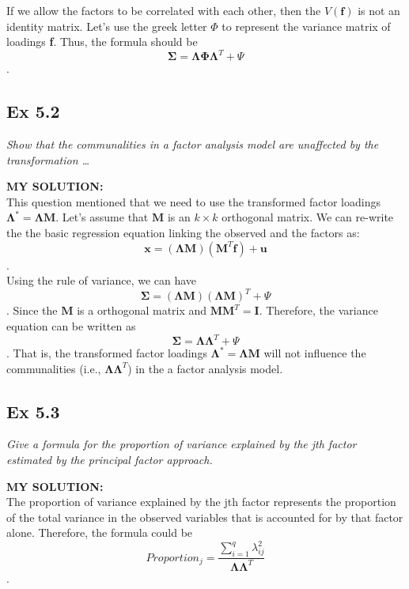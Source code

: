 \documentclass[
]{article}
\begin{document}
If we allow the factors to be correlated with each other, then the
\(V(\boldsymbol f)\) is not an identity matrix. Let's use the greek
letter \(\Phi\) to represent the variance matrix of loadings \textbf{f}.
Thus, the formula should be
\[\boldsymbol \Sigma = \boldsymbol\Lambda \boldsymbol \Phi \boldsymbol\Lambda^T + \Psi\].

\hypertarget{ex-5.2}{%
\subsection{Ex 5.2}\label{ex-5.2}}

\emph{Show that the communalities in a factor analysis model are
unaffected by the transformation \ldots{}}

\textbf{MY SOLUTION:}\\
This question mentioned that we need to use the transformed factor
loadings \(\boldsymbol \Lambda ^* = \boldsymbol \Lambda \boldsymbol M\).
Let's assume that \(\boldsymbol M\) is an \(k \times k\) orthogonal
matrix. We can re-write the the basic regression equation linking the
observed and the factors as:
\[\boldsymbol x=(\boldsymbol\Lambda \boldsymbol M)( \boldsymbol M^T \boldsymbol f) + \boldsymbol u\].\\
Using the rule of variance, we can have
\[\boldsymbol \Sigma = (\boldsymbol\Lambda \boldsymbol M)(\boldsymbol\Lambda \boldsymbol M)^T + \Psi\].
Since the \(\boldsymbol M\) is a orthogonal matrix and
\(\boldsymbol M \boldsymbol M^T = \boldsymbol I\). Therefore, the
variance equation can be written as
\[\boldsymbol \Sigma = \boldsymbol\Lambda \boldsymbol\Lambda^T + \Psi\].
That is, the transformed factor loadings
\(\boldsymbol \Lambda ^* = \boldsymbol \Lambda \boldsymbol M\) will not
influence the communalities (i.e.,
\(\boldsymbol\Lambda \boldsymbol\Lambda^T\)) in the a factor analysis
model.

\hypertarget{ex-5.3}{%
\subsection{Ex 5.3}\label{ex-5.3}}

\emph{Give a formula for the proportion of variance explained by the jth
factor estimated by the principal factor approach.}

\textbf{MY SOLUTION:}\\
The proportion of variance explained by the jth factor represents the
proportion of the total variance in the observed variables that is
accounted for by that factor alone. Therefore, the formula could be
\[Proportion_j = \frac {\sum_{i=1}^{q} \lambda_{ij}^2}{\boldsymbol \Lambda \boldsymbol \Lambda ^T}\].
\end{document}
